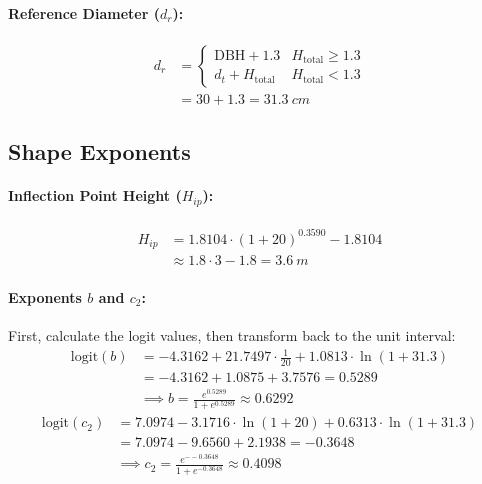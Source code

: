 \documentclass[twocolumn, bibliography=totoc]{scrartcl}
\begin{document}
\paragraph{Reference Diameter ($d_r$):}
\begin{equation}
\begin{aligned}
  d_r &= \begin{cases} 
    \text{DBH} + 1.3 & H_{\text{total}} \geq 1.3 \\ 
    d_t + H_{\text{total}} & H_{\text{total}} < 1.3 
  \end{cases} \\
  &= 30 + 1.3 = \qty{31.3}{cm}
\end{aligned}
\end{equation}

\subsection{Shape Exponents}

\paragraph{Inflection Point Height ($H_{ip}$):}

\begin{equation}
\begin{aligned}
  H_{ip} &= 1.8104 \cdot (1 + 20)^{0.3590} - 1.8104 \\
  &\approx 1.8 \cdot 3 - 1.8 = \qty{3.6}{m}
\end{aligned}
\end{equation}

\paragraph{Exponents $b$ and $c_2$:}
First, calculate the logit values, then transform back to the unit interval:
\begin{equation}
\begin{aligned}
  \text{logit}(b) &= -4.3162 + 21.7497 \cdot \frac{1}{20} + 1.0813 \cdot \ln(1 + 31.3) \\
  &= -4.3162 + 1.0875 + 3.7576 = 0.5289 \\
  &\implies b = \frac{e^{0.5289}}{1 + e^{0.5289}} \approx 0.6292
\end{aligned}
\end{equation}
\begin{equation}
\begin{aligned}
  \text{logit}(c_2) &= 7.0974 - 3.1716 \cdot \ln(1 + 20) + 0.6313 \cdot \ln(1 + 31.3) \\
  &= 7.0974 - 9.6560 + 2.1938 = -0.3648 \\
  &\implies c_2 = \frac{e^{--0.3648}}{1 + e^{-0.3648}} \approx 0.4098
\end{aligned}
\end{equation}
\end{document}
